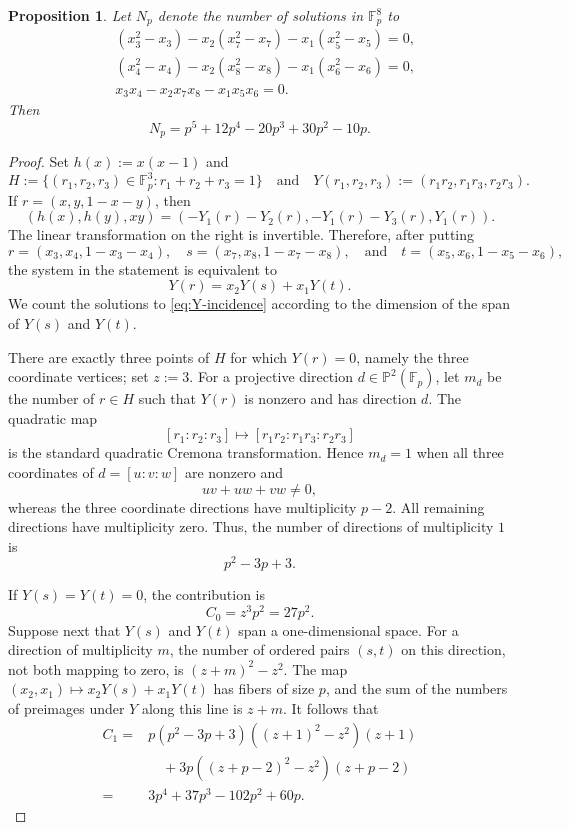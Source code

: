 \documentclass[a4paper]{amsart}
\newtheorem{proposition}[theorem]{Proposition}
\numberwithin{equation}{section}
\theoremstyle{remark}
\newcommand{\F}{\mathbb{F}}
\begin{document}
\begin{proposition}\label{prop:exceptional-point-count}
Let $N_p$ denote the number of solutions in $\F_p^8$ to
\[\begin{split}
&(x_3^2-x_3)-x_2(x_7^2-x_7)-x_1(x_5^2-x_5)=0,\\
&(x_4^2-x_4)-x_2(x_8^2-x_8)-x_1(x_6^2-x_6)=0,\\
&x_3x_4-x_2x_7x_8-x_1x_5x_6=0.
\end{split}\]
Then
\[N_p=p^5+12p^4-20p^3+30p^2-10p.\]
\end{proposition}
\begin{proof}
Set $h(x):=x(x-1)$ and
\[H:=\{(r_1,r_2,r_3)\in\F_p^3:r_1+r_2+r_3=1\}\quad\text{and}\quad Y(r_1,r_2,r_3):=(r_1r_2,r_1r_3,r_2r_3).\]
If $r=(x,y,1-x-y)$, then
\[(h(x),h(y),xy)=(-Y_1(r)-Y_2(r),-Y_1(r)-Y_3(r),Y_1(r)).\]
The linear transformation on the right is invertible. Therefore, after putting
\[r=(x_3,x_4,1-x_3-x_4),\quad s=(x_7,x_8,1-x_7-x_8),\quad\text{and}\quad t=(x_5,x_6,1-x_5-x_6),\]
the system in the statement is equivalent to
\begin{equation}\label{eq:Y-incidence}
Y(r)=x_2Y(s)+x_1Y(t).
\end{equation}
We count the solutions to \eqref{eq:Y-incidence} according to the dimension of the span of $Y(s)$ and $Y(t)$.

There are exactly three points of $H$ for which $Y(r)=0$, namely the three coordinate vertices; set $z:=3$. For a projective direction $d\in\mathbb{P}^2(\F_p)$, let $m_d$ be the number of $r\in H$ such that $Y(r)$ is nonzero and has direction $d$. The quadratic map
\[[r_1:r_2:r_3]\longmapsto[r_1r_2:r_1r_3:r_2r_3]\]
is the standard quadratic Cremona transformation. Hence $m_d=1$ when all three coordinates of $d=[u:v:w]$ are nonzero and
\[uv+uw+vw\neq0,\]
whereas the three coordinate directions have multiplicity $p-2$. All remaining directions have multiplicity zero. Thus, the number of directions of multiplicity $1$ is
\[p^2-3p+3.\]

If $Y(s)=Y(t)=0$, the contribution is
\begin{equation}\label{eq:C0}
C_0=z^3p^2=27p^2.
\end{equation}
Suppose next that $Y(s)$ and $Y(t)$ span a one-dimensional space. For a direction of multiplicity $m$, the number of ordered pairs $(s,t)$ on this direction, not both mapping to zero, is $(z+m)^2-z^2$. The map $(x_2,x_1)\mapsto x_2Y(s)+x_1Y(t)$ has fibers of size $p$, and the sum of the numbers of preimages under $Y$ along this line is $z+m$. It follows that
\begin{equation}\label{eq:C1}
\begin{split}
C_1={}&p(p^2-3p+3)((z+1)^2-z^2)(z+1)\\
&\quad +3p((z+p-2)^2-z^2)(z+p-2)\\
={}&3p^4+37p^3-102p^2+60p.
\end{split}
\end{equation}


\end{proof}
\end{document}
